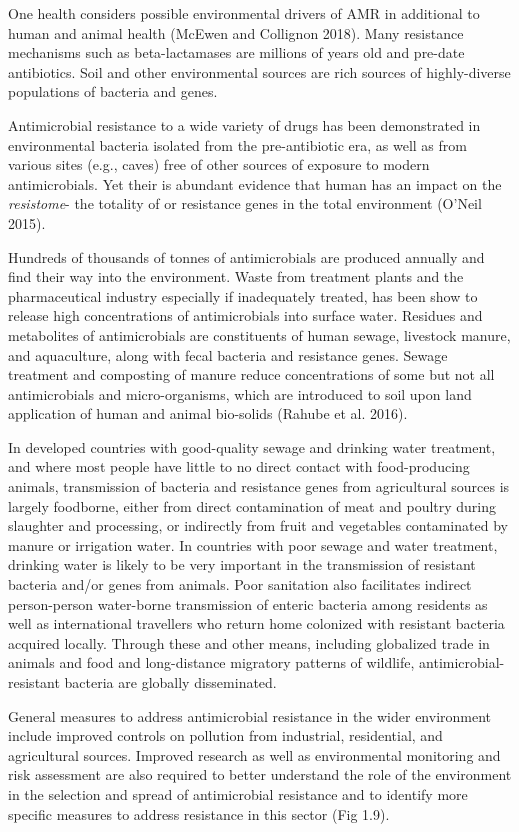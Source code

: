 \documentclass[]{tufte-handout}
\begin{document}
One health considers possible environmental drivers of AMR in additional
to human and animal health (McEwen and Collignon 2018). Many resistance
mechanisms such as beta-lactamases are millions of years old and
pre-date antibiotics. Soil and other environmental sources are rich
sources of highly-diverse populations of bacteria and genes.

Antimicrobial resistance to a wide variety of drugs has been
demonstrated in environmental bacteria isolated from the pre-antibiotic
era, as well as from various sites (e.g., caves) free of other sources
of exposure to modern antimicrobials. Yet their is abundant evidence
that human has an impact on the \emph{resistome}- the totality of or
resistance genes in the total environment (O'Neil 2015).

Hundreds of thousands of tonnes of antimicrobials are produced annually
and find their way into the environment. Waste from treatment plants and
the pharmaceutical industry especially if inadequately treated, has been
show to release high concentrations of antimicrobials into surface
water. Residues and metabolites of antimicrobials are constituents of
human sewage, livestock manure, and aquaculture, along with fecal
bacteria and resistance genes. Sewage treatment and composting of manure
reduce concentrations of some but not all antimicrobials and
micro-organisms, which are introduced to soil upon land application of
human and animal bio-solids (Rahube et al. 2016).

In developed countries with good-quality sewage and drinking water
treatment, and where most people have little to no direct contact with
food-producing animals, transmission of bacteria and resistance genes
from agricultural sources is largely foodborne, either from direct
contamination of meat and poultry during slaughter and processing, or
indirectly from fruit and vegetables contaminated by manure or
irrigation water. In countries with poor sewage and water treatment,
drinking water is likely to be very important in the transmission of
resistant bacteria and/or genes from animals. Poor sanitation also
facilitates indirect person-person water-borne transmission of enteric
bacteria among residents as well as international travellers who return
home colonized with resistant bacteria acquired locally. Through these
and other means, including globalized trade in animals and food and
long-distance migratory patterns of wildlife, antimicrobial-resistant
bacteria are globally disseminated.

General measures to address antimicrobial resistance in the wider
environment include improved controls on pollution from industrial,
residential, and agricultural sources. Improved research as well as
environmental monitoring and risk assessment are also required to better
understand the role of the environment in the selection and spread of
antimicrobial resistance and to identify more specific measures to
address resistance in this sector (Fig 1.9).
\end{document}
